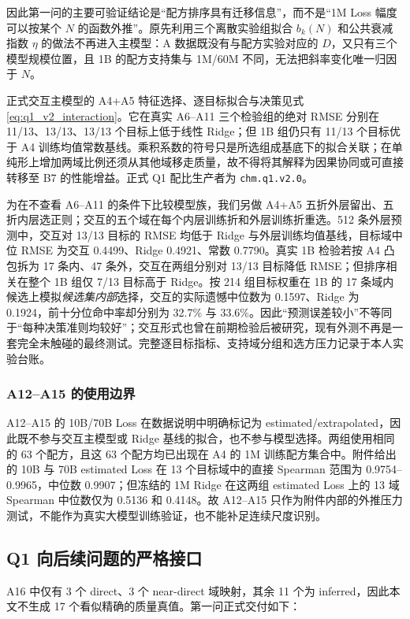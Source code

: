 因此第一问的主要可验证结论是“配方排序具有迁移信息”，而不是“1M Loss 幅度可以按某个 $N$ 的函数外推”。原先利用三个离散实验组拟合 $b_k(N)$ 和公共衰减指数 $\eta$ 的做法不再进入主模型：A 数据既没有与配方实验对应的 $D$，又只有三个模型规模位置，且 1B 的配方支持集与 1M/60M 不同，无法把斜率变化唯一归因于 $N$。

正式交互主模型的 A4+A5 特征选择、逐目标拟合与决策见式\eqref{eq:q1_v2_interaction}。它在真实 A6--A11 三个检验组的绝对 RMSE 分别在 11/13、13/13、13/13 个目标上低于线性 Ridge；但 1B 组仍只有 11/13 个目标优于 A4 训练均值常数基线。乘积系数的符号只是所选组成基底下的拟合关联；在单纯形上增加两域比例还须从其他域移走质量，故不得将其解释为因果协同或可直接转移至 B7 的性能增益。正式 Q1 配比生产者为 \texttt{chm.q1.v2.0}。

为在不查看 A6--A11 的条件下比较模型族，我们另做 A4+A5 五折外层留出、五折内层选正则；交互的五个域在每个内层训练折和外层训练折重选。512 条外层预测中，交互对 13/13 目标的 RMSE 均低于 Ridge 与外层训练均值基线，目标域中位 RMSE 为交互 0.4499、Ridge 0.4921、常数 0.7790。真实 1B 检验若按 A4 凸包拆为 17 条内、47 条外，交互在两组分别对 13/13 目标降低 RMSE；但排序相关在整个 1B 组仅 7/13 目标高于 Ridge。按 214 组目标权重在 1B 的 17 条域内候选上模拟\emph{候选集内部}选择，交互的实际遗憾中位数为 0.1597、Ridge 为 0.1924，前十分位命中率却分别为 32.7\% 与 33.6\%。因此“预测误差较小”不等同于“每种决策准则均较好”；交互形式也曾在前期检验后被研究，现有外测不再是一套完全未触碰的最终测试。完整逐目标指标、支持域分组和选方压力记录于本人实验台账。

\subsubsection{A12--A15 的使用边界}

A12--A15 的 10B/70B Loss 在数据说明中明确标记为 estimated/extrapolated，因此既不参与交互主模型或 Ridge 基线的拟合，也不参与模型选择。两组使用相同的 63 个配方，且这 63 个配方均已出现在 A4 的 1M 训练配方集合中。附件给出的 10B 与 70B estimated Loss 在 13 个目标域中的直接 Spearman 范围为 0.9754--0.9965，中位数 0.9907；但冻结的 1M Ridge 在这两组 estimated Loss 上的 13 域 Spearman 中位数仅为 0.5136 和 0.4148。故 A12--A15 只作为附件内部的外推压力测试，不能作为真实大模型训练验证，也不能补足连续尺度识别。

\subsection{Q1 向后续问题的严格接口}

A16 中仅有 3 个 direct、3 个 near-direct 域映射，其余 11 个为 inferred，因此本文不生成 17 个看似精确的质量真值。第一问正式交付如下：

